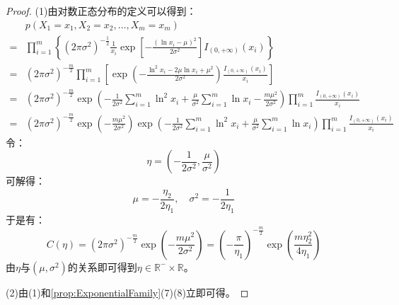 \begin{proof}
	(1)由对数正态分布的定义可以得到：
	\begin{align*}
		&p(X_1=x_1,X_2=x_2,\dots,X_m=x_m) \\
		=&\prod_{i=1}^{m}\left\{(2\pi\sigma^2)^{-\frac{1}{2}}\frac{1}{x_i}\exp\left[-\frac{(\ln x_i-\mu)^2}{2\sigma^2}\right]I_{(0,+\infty)}(x_i)\right\} \\
		=&(2\pi\sigma^2)^{-\frac{m}{2}}\prod_{i=1}^{m}\left[\exp\left(-\frac{\ln^2 x_i-2\mu\ln x_i+\mu^2}{2\sigma^2}\right)\frac{I_{(0,+\infty)}(x_i)}{x_i}\right] \\
		=&(2\pi\sigma^2)^{-\frac{m}{2}}\exp\left(-\frac{1}{2\sigma^2}\sum_{i=1}^{m}\ln^2 x_i+\frac{\mu}{\sigma^2}\sum_{i=1}^{m}\ln x_i-\frac{m\mu^2}{2\sigma^2}\right)\prod_{i=1}^{m}\frac{I_{(0,+\infty)}(x_i)}{x_i} \\
		=&(2\pi\sigma^2)^{-\frac{m}{2}}\exp\left(-\frac{m\mu^2}{2\sigma^2}\right)\exp\left(-\frac{1}{2\sigma^2}\sum_{i=1}^{m}\ln^2 x_i+\frac{\mu}{\sigma^2}\sum_{i=1}^{m}\ln x_i\right)\prod_{i=1}^{m}\frac{I_{(0,+\infty)}(x_i)}{x_i}
	\end{align*}
	令：
	\begin{equation*}
		\eta=\left(-\frac{1}{2\sigma^2},\frac{\mu}{\sigma^2}\right)
	\end{equation*}
	可解得：
	\begin{equation*}
		\mu=-\frac{\eta_2}{2\eta_1},\quad\sigma^2=-\frac{1}{2\eta_1}
	\end{equation*}
	于是有：
	\begin{equation*}
		C(\eta)=(2\pi\sigma^2)^{-\frac{m}{2}}\exp\left(-\frac{m\mu^2}{2\sigma^2}\right)=\left(-\frac{\pi}{\eta_1}\right)^{-\frac{m}{2}}\exp\left(\frac{m\eta_2^2}{4\eta_1}\right)
	\end{equation*}
	由$\eta$与$(\mu,\sigma^2)$的关系即可得到$\eta\in\mathbb{R}^{-}\times\mathbb{R}$。\par
	(2)由(1)和\cref{prop:ExponentialFamily}(7)(8)立即可得。
\end{proof}


